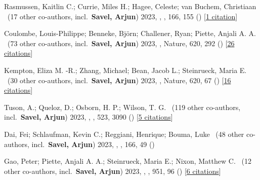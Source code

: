 \item[{\color{numcolor}\scriptsize28}] Rasmussen, Kaitlin C.; Currie, Miles H.; Hagee, Celeste; van Buchem, Christiaan \etal\ ({17} other co-authors, incl.\ \textbf{Savel, Arjun}) 2023, , \aj, {166}, 155 () [\href{https://ui.adsabs.harvard.edu/abs/2023AJ....166..155R}{1 citation}]

\item[{\color{numcolor}\scriptsize27}] Coulombe, Louis-Philippe; Benneke, Bj{\"o}rn; Challener, Ryan; Piette, Anjali A. A. \etal\ ({73} other co-authors, incl.\ \textbf{Savel, Arjun}) 2023, , Nature, {620}, 292 () [\href{https://ui.adsabs.harvard.edu/abs/2023Natur.620..292C}{26 citations}]

\item[{\color{numcolor}\scriptsize26}] Kempton, Eliza M. -R.; Zhang, Michael; Bean, Jacob L.; Steinrueck, Maria E. \etal\ ({30} other co-authors, incl.\ \textbf{Savel, Arjun}) 2023, , Nature, {620}, 67 () [\href{https://ui.adsabs.harvard.edu/abs/2023Natur.620...67K}{16 citations}]

\item[{\color{numcolor}\scriptsize25}] Tuson, A.; Queloz, D.; Osborn, H. P.; Wilson, T. G. \etal\ ({119} other co-authors, incl.\ \textbf{Savel, Arjun}) 2023, , \mnras, {523}, 3090 () [\href{https://ui.adsabs.harvard.edu/abs/2023MNRAS.523.3090T}{5 citations}]

\item[{\color{numcolor}\scriptsize24}] Dai, Fei; Schlaufman, Kevin C.; Reggiani, Henrique; Bouma, Luke \etal\ ({48} other co-authors, incl.\ \textbf{Savel, Arjun}) 2023, , \aj, {166}, 49 ()

\item[{\color{numcolor}\scriptsize23}] Gao, Peter; Piette, Anjali A. A.; Steinrueck, Maria E.; Nixon, Matthew C. \etal\ ({12} other co-authors, incl.\ \textbf{Savel, Arjun}) 2023, , \apj, {951}, 96 () [\href{https://ui.adsabs.harvard.edu/abs/2023ApJ...951...96G}{6 citations}]

